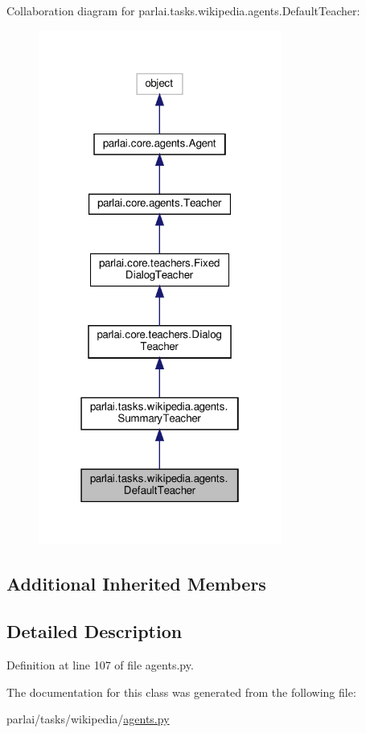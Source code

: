 Collaboration diagram for parlai.\+tasks.\+wikipedia.\+agents.\+Default\+Teacher\+:\nopagebreak
\begin{figure}[H]
\begin{center}
\leavevmode
\includegraphics[width=226pt]{d1/d96/classparlai_1_1tasks_1_1wikipedia_1_1agents_1_1DefaultTeacher__coll__graph}
\end{center}
\end{figure}
\subsection*{Additional Inherited Members}


\subsection{Detailed Description}


Definition at line 107 of file agents.\+py.



The documentation for this class was generated from the following file\+:\begin{DoxyCompactItemize}
\item 
parlai/tasks/wikipedia/\hyperlink{parlai_2tasks_2wikipedia_2agents_8py}{agents.\+py}\end{DoxyCompactItemize}
